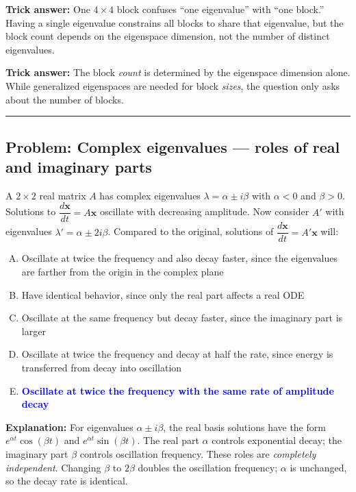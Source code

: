 \documentclass[12pt]{amsart}
\newcommand{\divider}{
  \vspace{-1em}
  \noindent
  \raisebox{-0.15ex}{\textbullet}%
  \hspace{0.5em}%
  \rule[0.5ex]{0.95\textwidth}{1.0pt}%
  \hspace{0.5em}%
  \raisebox{-0.15ex}{\textbullet}%
  \vspace{0em}
}
\begin{document}
\textbf{Trick answer:}
One $4 \times 4$ block confuses ``one eigenvalue'' with ``one block.''
Having a single eigenvalue constrains all blocks to share that eigenvalue,
but the block count depends on the eigenspace dimension, not the number of
distinct eigenvalues.

\textbf{Trick answer:}
The block \emph{count} is determined by the eigenspace dimension alone.
While generalized eigenspaces are needed for block \emph{sizes}, the
question only asks about the number of blocks.

\divider

\subsection*{Problem: Complex eigenvalues --- roles of real and imaginary parts}

A $2 \times 2$ real matrix $A$ has complex eigenvalues
$\lambda = \alpha \pm i\beta$ with $\alpha < 0$ and $\beta > 0$.
Solutions to $\dfrac{d\mathbf{x}}{dt} = A\mathbf{x}$ oscillate with
decreasing amplitude.
Now consider $A'$ with eigenvalues $\lambda' = \alpha \pm 2i\beta$.
Compared to the original, solutions of
$\dfrac{d\mathbf{x}}{dt} = A'\mathbf{x}$ will:

\begin{enumerate}[(A)]
\item Oscillate at twice the frequency and also decay faster, since the
      eigenvalues are farther from the origin in the complex plane
\item Have identical behavior, since only the real part affects a real ODE
\item Oscillate at the same frequency but decay faster, since the imaginary
      part is larger
\item Oscillate at twice the frequency and decay at half the rate, since
      energy is transferred from decay into oscillation
\item \textcolor{blue}{\textbf{Oscillate at twice the frequency with the
      same rate of amplitude decay}}
\end{enumerate}

\textbf{Explanation:}
For eigenvalues $\alpha \pm i\beta$, the real basis solutions have the form
$e^{\alpha t}\cos(\beta t)$ and $e^{\alpha t}\sin(\beta t)$.
The real part $\alpha$ controls exponential decay; the imaginary part $\beta$
controls oscillation frequency. These roles are \emph{completely independent}.
Changing $\beta$ to $2\beta$ doubles the oscillation frequency; $\alpha$ is
unchanged, so the decay rate is identical.
\end{document}
